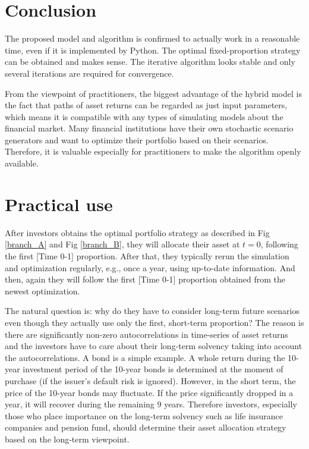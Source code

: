 \documentclass[11t]{article}
\begin{document}
\section{Conclusion}
The proposed model and algorithm is confirmed to actually work in a reasonable time, even if it is implemented by Python. The optimal fixed-proportion strategy can be obtained and makes sense. The iterative algorithm looks stable and only several iterations are required for convergence. 

From the viewpoint of practitioners, the biggest advantage of the hybrid model is the fact that paths of asset returns can be regarded as just input parameters, which means it is compatible with any types of simulating models about the financial market. Many financial institutions have their own stochastic scenario generators and want to optimize their portfolio based on their scenarios. Therefore, it is valuable especially for practitioners to make the algorithm openly available.

\section{Practical use}
After investors obtains the optimal portfolio strategy as described in Fig \ref{branch_A} and  Fig \ref{branch_B}, they will allocate their asset at $t = 0$, following the first [Time 0-1] proportion. After that, they typically rerun the simulation and optimization regularly, e.g., once a year, using up-to-date information. And then, again they will follow the first [Time 0-1] proportion obtained from the newest optimization. 

The natural question is: why do they have to consider long-term future scenarios even though they actually use only the first, short-term proportion?
The reason is there are significantly non-zero autocorrelations in time-series of asset returns 
and the investors have to care about their long-term solvency taking into account the autocorrelations.
A bond is a simple example.
A whole return during the 10-year investment period of the 10-year bonds is determined at the moment of purchase (if the issuer's default risk is ignored). 
However, in the short term, the price of the 10-year bonds may fluctuate.
If the price significantly dropped in a year, it will recover during the remaining 9 years. 
Therefore investors, especially those who place importance on the long-term solvency such as life insurance companies and pension fund, 
should determine their asset allocation strategy based on the long‐term viewpoint.


{}

\end{document}
